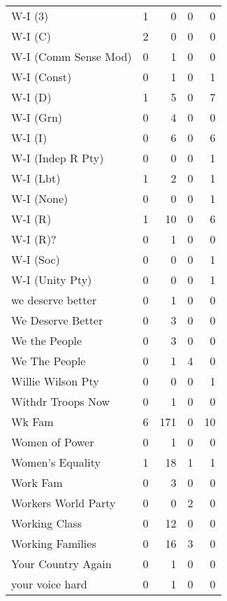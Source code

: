 \begin{supertabular}{lrrrr}
W-I (3) & 1 & 0 & 0 & 0\\
W-I (C) & 2 & 0 & 0 & 0\\
W-I (Comm Sense Mod) & 0 & 1 & 0 & 0\\
W-I (Const) & 0 & 1 & 0 & 1\\
W-I (D) & 1 & 5 & 0 & 7\\
W-I (Grn) & 0 & 4 & 0 & 0\\
W-I (I) & 0 & 6 & 0 & 6\\
W-I (Indep R Pty) & 0 & 0 & 0 & 1\\
W-I (Lbt) & 1 & 2 & 0 & 1\\
W-I (None) & 0 & 0 & 0 & 1\\
W-I (R) & 1 & 10 & 0 & 6\\
W-I (R)? & 0 & 1 & 0 & 0\\
W-I (Soc) & 0 & 0 & 0 & 1\\
W-I (Unity Pty) & 0 & 0 & 0 & 1\\
we deserve better & 0 & 1 & 0 & 0\\
We Deserve Better & 0 & 3 & 0 & 0\\
We the People & 0 & 3 & 0 & 0\\
We The People & 0 & 1 & 4 & 0\\
Willie Wilson Pty & 0 & 0 & 0 & 1\\
Withdr Troops Now & 0 & 1 & 0 & 0\\
Wk Fam & 6 & 171 & 0 & 10\\
Women of Power & 0 & 1 & 0 & 0\\
Women's Equality & 1 & 18 & 1 & 1\\
Work Fam & 0 & 3 & 0 & 0\\
Workers World Party & 0 & 0 & 2 & 0\\
Working Class & 0 & 12 & 0 & 0\\
Working Families & 0 & 16 & 3 & 0\\
Your Country Again & 0 & 1 & 0 & 0\\
your voice hard & 0 & 1 & 0 & 0\\
\bottomrule
\end{supertabular}
